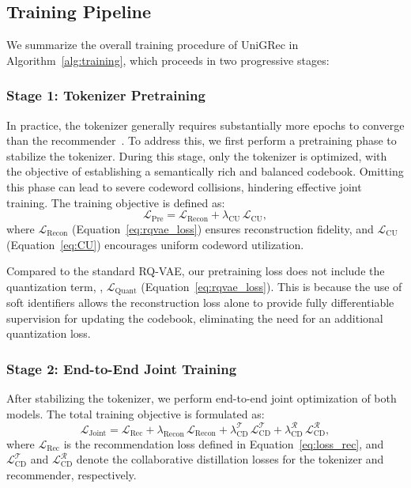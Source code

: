 \subsection{Training Pipeline}\label{sec:pipeline}

We summarize the overall training procedure of UniGRec in Algorithm~\ref{alg:training}, which proceeds in two progressive stages:

\subsubsection{Stage 1: Tokenizer Pretraining} 
In practice, the tokenizer generally requires substantially more epochs to converge than the recommender~\cite{TIGER,LETTER}. To address this, we first perform a pretraining phase to stabilize the tokenizer. During this stage, only the tokenizer is optimized, with the objective of establishing a semantically rich and balanced codebook. Omitting this phase can lead to severe codeword collisions, hindering effective joint training. The training objective is defined as:
\begin{equation}\label{eq:pre}
    \mathcal{L}_\text{Pre} = \mathcal{L}_\text{Recon} + \lambda_\text{CU} \, \mathcal{L}_\text{CU},
\end{equation}
where $\mathcal{L}_\text{Recon}$ (Equation~\eqref{eq:rqvae_loss}) ensures reconstruction fidelity, and $\mathcal{L}_\text{CU}$ (Equation~\eqref{eq:CU}) encourages uniform codeword utilization.

Compared to the standard RQ-VAE, our pretraining loss does not include the quantization term, \ie, $\mathcal{L}_\text{Quant}$ (Equation~\eqref{eq:rqvae_loss}). This is because the use of soft identifiers allows the reconstruction loss alone to provide fully differentiable supervision for updating the codebook, eliminating the need for an additional quantization loss.


\subsubsection{Stage 2: End-to-End Joint Training} 
After stabilizing the tokenizer, we perform end-to-end joint optimization of both models. The total training objective is formulated as:
\begin{equation}\label{eq:joint}
    \mathcal{L}_\text{Joint} = \mathcal{L}_\text{Rec} 
    + \lambda_\text{Recon}\, \mathcal{L}_\text{Recon} 
    + \lambda_\text{CD}^\mathcal{T} \, \mathcal{L}_\text{CD}^\mathcal{T} 
    + \lambda_\text{CD}^\mathcal{R} \, \mathcal{L}_\text{CD}^\mathcal{R},
\end{equation}
where $\mathcal{L}_\text{Rec}$ is the recommendation loss defined in Equation~\eqref{eq:loss_rec}, and $\mathcal{L}_\text{CD}^\mathcal{T}$ and $\mathcal{L}_\text{CD}^\mathcal{R}$ denote the collaborative distillation losses for the tokenizer and recommender, respectively. 

